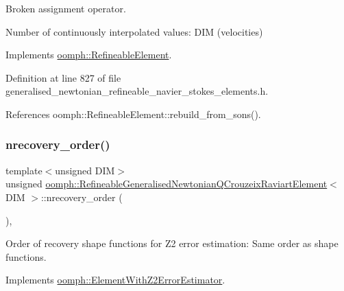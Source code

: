 Broken assignment operator. 

Number of continuously interpolated values\+: D\+IM (velocities) 

Implements \hyperlink{classoomph_1_1RefineableElement_a53e171a18c9f43f1db90a6876516a073}{oomph\+::\+Refineable\+Element}.



Definition at line 827 of file generalised\+\_\+newtonian\+\_\+refineable\+\_\+navier\+\_\+stokes\+\_\+elements.\+h.



References oomph\+::\+Refineable\+Element\+::rebuild\+\_\+from\+\_\+sons().

\mbox{\label{classoomph_1_1RefineableGeneralisedNewtonianQCrouzeixRaviartElement_a6a5c45a61f21c73dd72bce3adf0ebd07}} 
\subsubsection{\texorpdfstring{nrecovery\+\_\+order()}{nrecovery\_order()}}
{\footnotesize\ttfamily template$<$unsigned D\+IM$>$ \\
unsigned \hyperlink{classoomph_1_1RefineableGeneralisedNewtonianQCrouzeixRaviartElement}{oomph\+::\+Refineable\+Generalised\+Newtonian\+Q\+Crouzeix\+Raviart\+Element}$<$ D\+IM $>$\+::nrecovery\+\_\+order (\begin{DoxyParamCaption}{ }\end{DoxyParamCaption})\hspace{0.3cm}{\ttfamily [inline]}, {\ttfamily [virtual]}}



Order of recovery shape functions for Z2 error estimation\+: Same order as shape functions. 



Implements \hyperlink{classoomph_1_1ElementWithZ2ErrorEstimator_af39480835bd3e0f6b2f4f7a9a4044798}{oomph\+::\+Element\+With\+Z2\+Error\+Estimator}.



